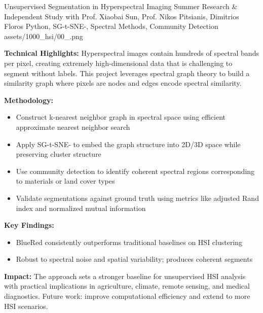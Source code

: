 \ProjectEntry
{Unsupervised Segmentation in Hyperspectral Imaging}
{Summer Research \& Independent Study with Prof. Xiaobai Sun, Prof. Nikos Pitsianis, Dimitrios Floros}
{Python, SG-t-SNE-\textPi, Spectral Methods, Community Detection}
{
}
{assets/1000_hsi/00_.png}
{}
{  }

\textbf{Technical Highlights:}
Hyperspectral images contain hundreds of spectral bands per pixel, creating extremely high-dimensional data that is challenging to segment without labels. This project leverages spectral graph theory to build a similarity graph where pixels are nodes and edges encode spectral similarity.

\textbf{Methodology:}
\begin{itemize}[leftmargin=1.2em, itemsep=0.1em]
  \item Construct k-nearest neighbor graph in spectral space using efficient approximate nearest neighbor search
  \item Apply SG-t-SNE-\textPi{} to embed the graph structure into 2D/3D space while preserving cluster structure
  \item Use community detection to identify coherent spectral regions corresponding to materials or land cover types
  \item Validate segmentations against ground truth using metrics like adjusted Rand index and normalized mutual information
\end{itemize}

\textbf{Key Findings:}
\begin{itemize}[leftmargin=1.2em, itemsep=0.1em]
  \item BlueRed consistently outperforms traditional baselines on HSI clustering
  \item Robust to spectral noise and spatial variability; produces coherent segments
\end{itemize}

\textbf{Impact:} 
The approach sets a stronger baseline for unsupervised HSI analysis with practical implications in agriculture, climate, remote sensing, and medical diagnostics. Future work: improve computational efficiency and extend to more HSI scenarios.